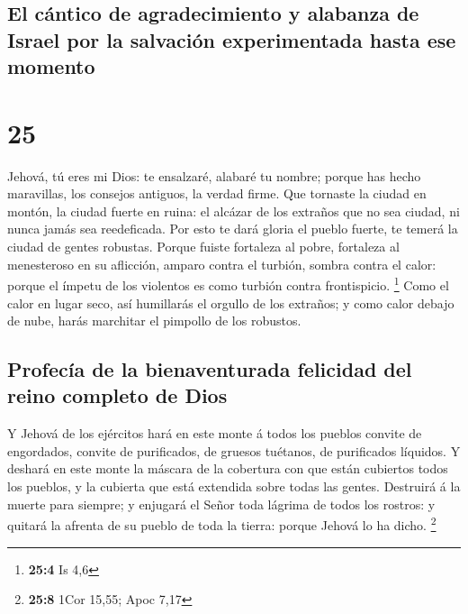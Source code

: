 \hypertarget{el-cuxe1ntico-de-agradecimiento-y-alabanza-de-israel-por-la-salvaciuxf3n-experimentada-hasta-ese-momento}{%
\subsection{El cántico de agradecimiento y alabanza de Israel por la
salvación experimentada hasta ese
momento}\label{el-cuxe1ntico-de-agradecimiento-y-alabanza-de-israel-por-la-salvaciuxf3n-experimentada-hasta-ese-momento}}

\hypertarget{section-24}{%
\section{25}\label{section-24}}

 Jehová, tú eres mi Dios: te ensalzaré, alabaré tu nombre;
porque has hecho maravillas, los consejos antiguos, la verdad firme.
 Que tornaste la ciudad en montón, la ciudad fuerte en
ruina: el alcázar de los extraños que no sea ciudad, ni nunca jamás sea
reedeficada.  Por esto te dará gloria el pueblo fuerte, te
temerá la ciudad de gentes robustas.  Porque fuiste
fortaleza al pobre, fortaleza al menesteroso en su aflicción, amparo
contra el turbión, sombra contra el calor: porque el ímpetu de los
violentos es como turbión contra frontispicio. \footnote{\textbf{25:4}
  Is 4,6}  Como el calor en lugar seco, así humillarás el
orgullo de los extraños; y como calor debajo de nube, harás marchitar el
pimpollo de los robustos.

\hypertarget{profecuxeda-de-la-bienaventurada-felicidad-del-reino-completo-de-dios}{%
\subsection{Profecía de la bienaventurada felicidad del reino completo
de
Dios}\label{profecuxeda-de-la-bienaventurada-felicidad-del-reino-completo-de-dios}}

 Y Jehová de los ejércitos hará en este monte á todos los
pueblos convite de engordados, convite de purificados, de gruesos
tuétanos, de purificados líquidos.  Y deshará en este monte
la máscara de la cobertura con que están cubiertos todos los pueblos, y
la cubierta que está extendida sobre todas las gentes. 
Destruirá á la muerte para siempre; y enjugará el Señor toda lágrima de
todos los rostros: y quitará la afrenta de su pueblo de toda la tierra:
porque Jehová lo ha dicho. \footnote{\textbf{25:8} 1Cor 15,55; Apoc 7,17}

